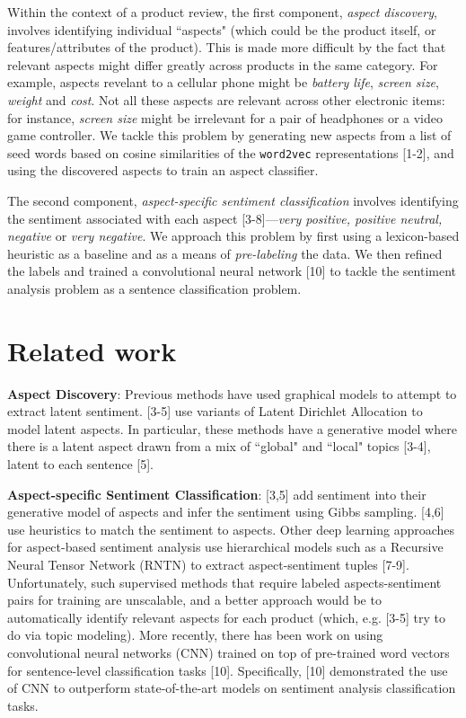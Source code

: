 \documentclass{article} %
\begin{document}
Within the context of a product review, the first component, \textit{aspect discovery}, involves identifying individual ``aspects" (which could be the product itself, or features/attributes of the product). This is made more difficult by the fact that relevant aspects might differ greatly across products in the same category. For example, aspects revelant to a cellular phone might be \textit{battery life}, \textit{screen size}, \textit{weight} and \textit{cost}. Not all these aspects are relevant across other electronic items: for instance, \textit{screen size} might be irrelevant for a pair of headphones or a video game controller. We tackle this problem by generating new aspects from a list of seed words based on cosine similarities of the \texttt{word2vec} representations [1-2], and using the discovered aspects to train an aspect classifier.

The second component, \textit{aspect-specific sentiment classification} involves identifying the sentiment associated with each aspect [3-8]---\textit{very positive, positive neutral, negative} or \textit{very negative}. We approach this problem by first using a lexicon-based heuristic as a baseline and as a means of \textit{pre-labeling} the data. We then refined the labels and trained a convolutional neural network [10] to tackle the sentiment analysis problem as a sentence classification problem.

\section{Related work}


\textbf{Aspect Discovery}: Previous methods have used graphical models to attempt to extract latent sentiment. [3-5] use variants of Latent Dirichlet Allocation to model latent aspects. In particular, these methods have a generative model where there is a latent aspect drawn from a mix of ``global" and ``local" topics [3-4], latent to each sentence [5].



\textbf{Aspect-specific Sentiment Classification}: [3,5] add sentiment into their generative model of aspects and infer the sentiment using Gibbs sampling. [4,6] use heuristics to match the sentiment to aspects. Other deep learning approaches for aspect-based sentiment analysis use hierarchical models such as a Recursive Neural Tensor Network (RNTN) to extract aspect-sentiment tuples [7-9]. Unfortunately, such supervised methods that require labeled aspects-sentiment pairs for training are unscalable, and a better approach would be to automatically identify relevant aspects for each product (which, e.g. [3-5] try to do via topic modeling). More recently, there has been work on using convolutional neural networks (CNN) trained on top of pre-trained word vectors for sentence-level classification tasks [10]. Specifically, [10] demonstrated the use of CNN to outperform state-of-the-art models on sentiment analysis classification tasks.
\end{document}
